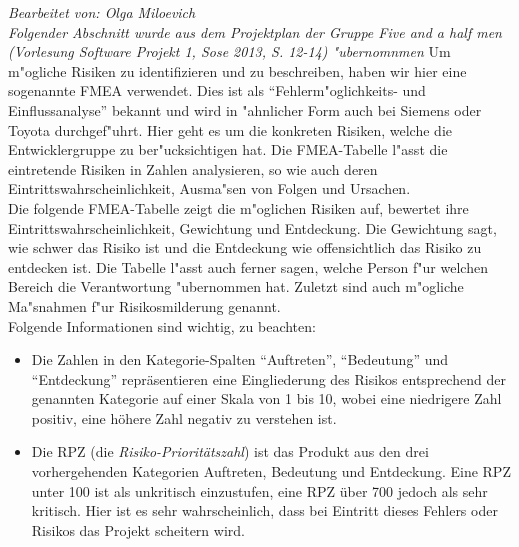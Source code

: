 \textit{Bearbeitet von: Olga Miloevich}\\
\textit{Folgender Abschnitt wurde aus dem Projektplan der Gruppe Five and a half men (Vorlesung Software Projekt 1, Sose 2013, S. 12-14) "ubernomnmen}
Um m"ogliche Risiken zu identifizieren und zu beschreiben, haben wir hier eine sogenannte FMEA verwendet. Dies ist als ``Fehlerm"oglichkeits- und Einflussanalyse'' bekannt und wird in "ahnlicher Form auch bei Siemens oder Toyota durchgef"uhrt. Hier geht es um die konkreten Risiken, welche die Entwicklergruppe zu ber"ucksichtigen hat. Die FMEA-Tabelle l"asst die eintretende Risiken in Zahlen analysieren, so wie auch deren Eintrittswahrscheinlichkeit, Ausma"sen von Folgen und Ursachen.\\
Die folgende FMEA-Tabelle zeigt die m"oglichen Risiken auf, bewertet ihre Eintrittswahrscheinlichkeit, Gewichtung und Entdeckung. Die Gewichtung sagt, wie schwer das Risiko ist und die Entdeckung wie offensichtlich das Risiko zu entdecken ist. Die Tabelle l"asst auch ferner sagen, welche Person f"ur welchen Bereich die Verantwortung "ubernommen hat. Zuletzt sind auch m"ogliche Ma"snahmen f"ur Risikosmilderung genannt. \\
Folgende Informationen sind wichtig, zu beachten:\\
\begin{itemize}
 \item Die Zahlen in den Kategorie-Spalten ``Auftreten'', ``Bedeutung'' und ``Entdeckung'' repr\"{a}sentieren eine Eingliederung des Risikos entsprechend der genannten Kategorie auf einer Skala von 1 bis 10, wobei eine niedrigere Zahl positiv, eine h\"{o}here Zahl negativ zu verstehen ist.
 \item Die RPZ (die \textit{Risiko-Priorit\"{a}tszahl}) ist das Produkt aus den drei vorhergehenden Kategorien Auftreten, Bedeutung und Entdeckung.\newline
 Eine RPZ unter 100 ist als unkritisch einzustufen, eine RPZ \"{u}ber 700 jedoch als sehr kritisch. Hier ist es sehr wahrscheinlich, dass bei Eintritt dieses Fehlers oder Risikos das Projekt scheitern wird.
\end{itemize}

